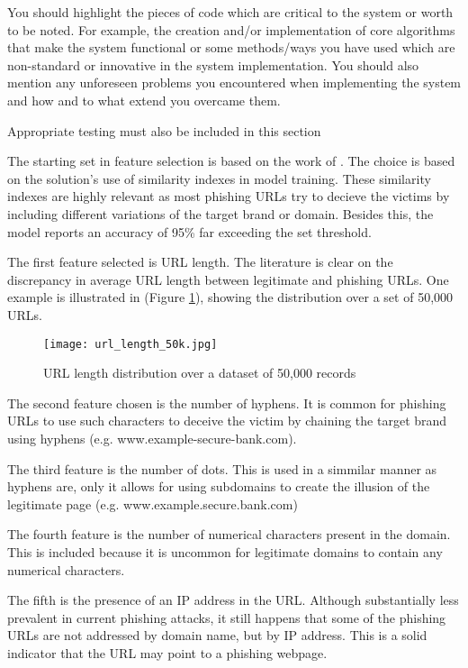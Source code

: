 	You should highlight the pieces of code which are critical to the system or worth to be noted. For example, the creation and/or implementation of core algorithms that make the system functional or some methods/ways you have used which are non-standard or innovative in the system implementation. You should also mention any unforeseen problems you encountered when implementing the system and how and to what extend you overcame them.

	Appropriate testing must also be included in this section







	The starting set in feature selection is based on the work of \cite{SVM_SIMILARITY_INDEX}. The choice is based on the solution's use of similarity indexes in model training. These similarity indexes are highly relevant as most phishing URLs try to decieve the victims by including different variations of the target brand or domain. Besides this, the model reports an accuracy of 95\% far exceeding the set threshold.

	The first feature selected is URL length. The literature is clear on the discrepancy in average URL length between legitimate and phishing URLs. One example is illustrated in \cite{STACKED_ML_URL_HTML} (Figure \ref{fig:URL_LENGTH_DISTRIBUTION}), showing the distribution over a set of 50,000 URLs.

	\begin{figure}[t]
		\centering
		\texttt{[image: url\_length\_50k.jpg]}
		\caption{URL length distribution over a dataset of 50,000 records}
		\label{fig:URL_LENGTH_DISTRIBUTION}
	\end{figure}

	The second feature chosen is the number of hyphens. It is common for phishing URLs to use such characters to deceive the victim by chaining the target brand using hyphens (e.g. www.example-secure-bank.com).

	The third feature is the number of dots. This is used in a simmilar manner as hyphens are, only it allows for using subdomains to create the illusion of the legitimate page (e.g. www.example.secure.bank.com)

	The fourth feature is the number of numerical characters present in the domain. This is included because it is uncommon for legitimate domains to contain any numerical characters.

	The fifth is the presence of an IP address in the URL. Although substantially less prevalent in current phishing attacks, it still happens that some of the phishing URLs are not addressed by domain name, but by IP address. This is a solid indicator that the URL may point to a phishing webpage.

